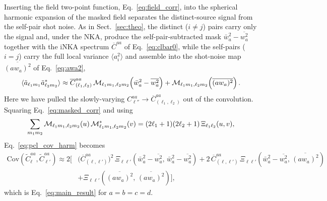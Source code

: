 \documentclass[%
 reprint,
superscriptaddress,
nofootinbib,
 amsmath,amssymb,
 aps,
 prd,
]{revtex4-2}
\begin{document}
Inserting the field two-point function, Eq.~\ref{eq:field_corr}, into the spherical harmonic expansion of the masked field separates the distinct-source signal from the self-pair shot noise. As in Sect.~\ref{sec:theo}, the distinct ($i\neq j$) pairs carry only the signal and, under the NKA, produce the self-pair-subtracted mask $\bar{w}_a^2-\overline{w_a^2}$ together with the iNKA spectrum $\overline{C}^{aa}$ of Eq.~\ref{eq:clbar0}, while the self-pairs ($i=j$) carry the full local variance $\langle a_i^2\rangle$ and assemble into the shot-noise map $\overline{(aw_a)^2}$ of Eq.~\ref{eq:awa2},
\begin{equation}\label{eq:masked_corr}
    \langle\tilde{a}_{\ell_1 m_1}\tilde{a}^*_{\ell_2 m_2}\rangle \approx \overline{C}^{aa}_{(\ell_1,\ell_2)}\,{\cal M}_{\ell_1 m_1,\ell_2 m_2}\!\left(\bar{w}_a^2-\overline{w_a^2}\right) + {\cal M}_{\ell_1 m_1,\ell_2 m_2}\!\left(\overline{(aw_a)^2}\right).
\end{equation}
Here we have pulled the slowly-varying $C^{aa}_{\ell''}\to\overline{C}^{aa}_{(\ell_1,\ell_2)}$ out of the convolution. Squaring Eq.~\ref{eq:masked_corr} and using
\begin{equation}\label{eq:M2_xi}
    \sum_{m_1 m_2}{\cal M}_{\ell_1 m_1,\ell_2 m_2}(u)\,{\cal M}^*_{\ell_1 m_1,\ell_2 m_2}(v) = (2\ell_1+1)(2\ell_2+1)\,\Xi_{\ell_1\ell_2}(u,v),
\end{equation}
Eq.~\ref{eq:pcl_cov_harm} becomes
\begin{equation}\label{eq:brute_nka}
\begin{split}
    \mathrm{Cov}(\tilde{C}_{\ell}^{aa},\tilde{C}_{\ell'}^{aa}) \approx 2\Big[&\big(\overline{C}^{aa}_{(\ell,\ell')}\big)^2\,\Xi_{\ell\ell'}\!\left(\bar{w}_a^2-\overline{w_a^2},\,\bar{w}_a^2-\overline{w_a^2}\right) + 2\,\overline{C}^{aa}_{(\ell,\ell')}\,\Xi_{\ell\ell'}\!\left(\bar{w}_a^2-\overline{w_a^2},\,\overline{(aw_a)^2}\right) \\
    &+ \Xi_{\ell\ell'}\!\left(\overline{(aw_a)^2},\,\overline{(aw_a)^2}\right)\Big],
\end{split}
\end{equation}
which is Eq.~\ref{eq:main_result} for $a=b=c=d$. 
 

\twocolumngrid


\end{document}
